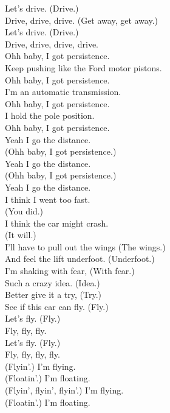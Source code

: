 Let's drive. (Drive.) \\
Drive, drive, drive. (Get away, get away.) \\
Let's drive. (Drive.) \\
Drive, drive, drive, drive. \\

Ohh baby, I got persistence. \\
Keep pushing like the Ford motor pistons. \\
Ohh baby, I got persistence. \\
I'm an automatic transmission. \\
Ohh baby, I got persistence. \\
I hold the pole position. \\
Ohh baby, I got persistence. \\
Yeah I go the distance. \\

(Ohh baby, I got persistence.) \\
Yeah I go the distance. \\
(Ohh baby, I got persistence.) \\
Yeah I go the distance. \\

I think I went too fast. \\
(You did.) \\
I think the car might crash. \\
(It will.) \\
I'll have to pull out the wings (The wings.) \\
And feel the lift underfoot. (Underfoot.) \\

I'm shaking with fear, (With fear.) \\
Such a crazy idea. (Idea.) \\
Better give it a try, (Try.) \\
See if this car can fly. (Fly.) \\

Let's fly. (Fly.) \\
Fly, fly, fly. \\
Let's fly. (Fly.) \\
Fly, fly, fly, fly. \\

(Flyin'.) I'm flying. \\
(Floatin'.) I'm floating. \\
(Flyin', flyin', flyin'.) I'm flying. \\
(Floatin'.) I'm floating. \\

